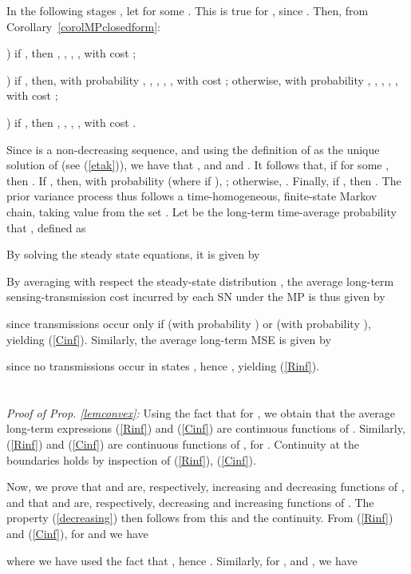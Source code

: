 \documentclass[10pt,twocolumn,twoside]{IEEEtran}
\theoremstyle{plain}
\begin{document}
In the following stages , let  for some . This is true for , since .
Then, from Corollary~\ref{corolMPclosedform}:

) if , then , , ,
, with cost ;

) if , then, with probability , , , ,
, with cost ;
otherwise, with probability ,
, , ,
, with cost ;
  
  ) if , then
, , ,
, with cost .

Since  is a non-decreasing sequence,
and using the definition of  as the unique solution of  (see (\ref{etak})),
 we have that ,
 and  and  .
It follows that, if  for some , then .
If , then, with probability  (where  if ), ; otherwise, .
Finally, if , then .
The prior variance process  thus follows a time-homogeneous, finite-state Markov chain,
taking value from the set . Let  be the long-term time-average probability that , defined as 

By solving the steady state equations, it is given by

By averaging with respect the steady-state distribution ,
the average long-term sensing-transmission cost incurred by each SN under the MP is thus given by

since transmissions occur only if  (with probability ) or 
 (with probability ), yielding (\ref{Cinf}).
Similarly, the average long-term MSE is given by

since no transmissions occur in states , hence ,
yielding  (\ref{Rinf}).
\hfill\QED

\vspace{-3mm}
\section{}
\label{proofoflemconvex}
\noindent\emph{Proof of Prop. \ref{lemconvex}:}
Using the fact that  for , we
obtain that
the average long-term expressions (\ref{Rinf}) and (\ref{Cinf}) are continuous functions of 
.
Similarly, (\ref{Rinf}) and (\ref{Cinf}) are continuous functions of , for .
Continuity at the boundaries holds by inspection of (\ref{Rinf}), (\ref{Cinf}).

Now, we prove that  and 
are, respectively, increasing and decreasing functions of ,
and that  and 
are, respectively, decreasing and increasing functions of .
The property (\ref{decreasing}) then follows from this and the continuity.
From (\ref{Rinf}) and (\ref{Cinf}), for  and  we have

where we have used the fact that , hence .
Similarly, for ,  and , we have
\end{document}
